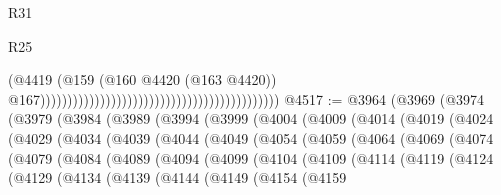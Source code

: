 \begin{lexlean}{R31}
\begin{lexlean}{R25}
\begin{coremodule}
{{{{{{{{{{{{{{{{{{{{{{{{{{{{{{{{{{{{{{{{{{{{{{{{{{{{{{{{{{{{{{{{{{{{{{{{{{{{{{{{{{{{{{{{{{{{{{{{{{{{{{{{{{{{{{{{{{{{{{{{{{{{{{{{{{{{{{{{{{{{{{{{{{{{{{{{{{{{{{{{{{{{{{{{{{{{{{{{{{{{{{{{{{{{{{{{{{{{{{{                                                                                        (@4419
                                                                                          (@159
                                                                                            (@160
                                                                                              @4420
                                                                                              (@163
                                                                                                @4420))
                                                                                            @167))))))))))))))))))))))))))))))))))))))))))))
@4517 := @3964
    (@3969
      (@3974
        (@3979
          (@3984
            (@3989
              (@3994
                (@3999
                  (@4004
                    (@4009
                      (@4014
                        (@4019
                          (@4024
                            (@4029
                              (@4034
                                (@4039
                                  (@4044
                                    (@4049
                                      (@4054
                                        (@4059
                                          (@4064
                                            (@4069
                                              (@4074
                                                (@4079
                                                  (@4084
                                                    (@4089
                                                      (@4094
                                                        (@4099
                                                          (@4104
                                                            (@4109
                                                              (@4114
                                                                (@4119
                                                                  (@4124
                                                                    (@4129
                                                                      (@4134
                                                                        (@4139
                                                                          (@4144
                                                                            (@4149
                                                                              (@4154
                                                                                (@4159
}}}}}}}}}}}}}}}}}}}}}}}}}}}}}}}}}}}}}}}}}}}}}}}}}}}}}}}}}}}}}}}}}}}}}}}}}}}}}}}}}}}}}}}}}}}}}}}}}}}}}}}}}}}}}}}}}}}}}}}}}}}}}}}}}}}}}}}}}}}}}}}}}}}}}}}}}}}}}}}}}}}}}}}}}}}}}}}}}}}}}}}}}}}}}}}}}}}}}}}
\end{coremodule}
\end{lexlean}
\end{lexlean}

